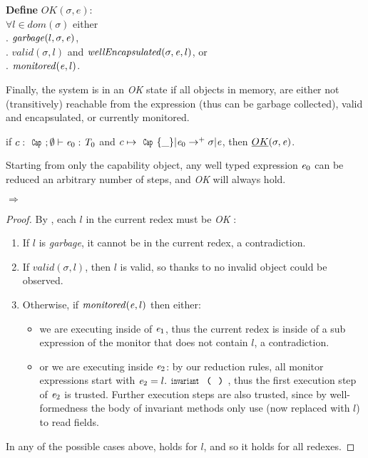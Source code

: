 \noindent\textbf{Define} $\mathit{OK}(\sigma,e)$:\\
\indent $\forall l\in\textit{dom}(\sigma)$
  either\\
\indent{}. $\mathit{garbage}(l,\sigma,{\mathit{e}})$,\\
\indent{}. $\mathit{valid}(\sigma,l)$ and $\mathit{wellEncapsulated}(\sigma,{\mathit{e}},l)$, or\\
\indent{}. $\mathit{monitored}({\mathit{e}},l)$.

\noindent Finally, the system is in an \emph{OK} state
if all objects in memory, are either
not (transitively) reachable from the expression (thus can be garbage collected),
valid and encapsulated,
or currently monitored.

\begin{theorem}\rm
if $c:\Kw{Cap};\emptyset\vdash \e_0: \T_0$ and
$c\mapsto\Kw{Cap}\{\_\}|\e_0\rightarrow^+ \sigma|\e$, then
$\emph{OK}(\sigma,{\mathit{e}})$.
\end{theorem}
\noindent Starting from only the capability object,
any well typed expression ${\mathit{e}}_0$ can be reduced   an arbitrary number of steps,
and \emph{OK} will always hold.

\begin{theorem}\rm {} $\Rightarrow$ 
\end{theorem}
\begin{proof}
\noindent By , each $l$ in the current redex must be \emph{OK} :
\begin{enumerate}
	\item If $l$ is \emph{garbage}, it cannot be in the current redex, a contradiction.
	\item If $\mathit{valid}(\sigma,l)$, then $l$ is valid, so thanks to 
	no invalid object could be observed.
	\item Otherwise, if $\mathit{monitored}({\mathit{e}},l)$ then either:
	\begin{itemize}
	 \item we are executing inside of ${\mathit{e}}_1$, thus the current redex is inside of a sub expression of the monitor that does not contain $l$, a contradiction.
	 \item or we are executing inside ${\mathit{e}}_2$:
	 by our reduction rules, all monitor expressions start with
	 $\e_2=l.\invariant$, thus the first execution step
	 of ${\mathit{e}}_2$ is trusted. Further execution steps are also trusted, since by well-formedness the body of invariant methods only use \Q@this@ (now replaced with $l$) to read fields.
	\end{itemize}
\end{enumerate}
In any of the possible cases above,  holds for $l$, and so it holds for all redexes.
\end{proof}

